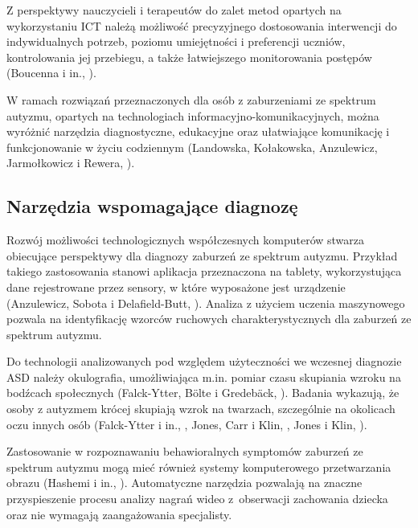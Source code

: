     Z perspektywy nauczycieli i terapeutów do zalet metod opartych na wykorzystaniu ICT należą możliwość precyzyjnego dostosowania interwencji do indywidualnych potrzeb, poziomu umiejętności i preferencji uczniów, kontrolowania jej przebiegu, a także łatwiejszego monitorowania postępów (Boucenna i in., \cite*{boucenna2014interactive}).
    
    
    W ramach rozwiązań przeznaczonych dla osób z zaburzeniami ze spektrum autyzmu, opartych na technologiach informacyjno-komunikacyjnych, można wyróżnić narzędzia diagnostyczne, edukacyjne oraz ułatwiające komunikację i funkcjonowanie w życiu codziennym (Landowska, Kołakowska, Anzulewicz, Jarmołkowicz i Rewera, \cite*{landowska2014technologie}).
    
    \subsection{Narzędzia wspomagające diagnozę}
    Rozwój możliwości technologicznych współczesnych komputerów stwarza obiecujące perspektywy dla diagnozy zaburzeń ze spektrum autyzmu.
    Przykład takiego zastosowania stanowi aplikacja przeznaczona na tablety, wykorzystująca dane rejestrowane przez sensory, w które wyposażone jest urządzenie (Anzulewicz, Sobota i Delafield-Butt, \cite*{anzulewicz2016toward}).
    Analiza z użyciem uczenia maszynowego pozwala na identyfikację wzorców ruchowych charakterystycznych dla zaburzeń ze spektrum autyzmu.
    
    Do technologii analizowanych pod względem użyteczności we wczesnej diagnozie ASD należy okulografia, umożliwiająca m.in. pomiar czasu skupiania wzroku na bodźcach społecznych (Falck-Ytter, B{\"o}lte i Gredeb{\"a}ck, \cite*{falck2013eye}).
    Badania wykazują, że osoby z autyzmem krócej skupiają wzrok na twarzach, szczególnie na okolicach oczu innych osób (Falck-Ytter i in., \cite*{falck2013eye}, Jones, Carr i Klin, \cite*{jones2008absence}, Jones i Klin, \cite*{jones2013attention}).
    
    Zastosowanie w rozpoznawaniu behawioralnych symptomów zaburzeń ze spektrum autyzmu mogą mieć również systemy komputerowego przetwarzania obrazu (Hashemi i in., \cite*{hashemi2012computer}).
    Automatyczne narzędzia pozwalają na znaczne przyspieszenie procesu analizy nagrań wideo z~obserwacji zachowania dziecka oraz nie wymagają zaangażowania specjalisty.
    
